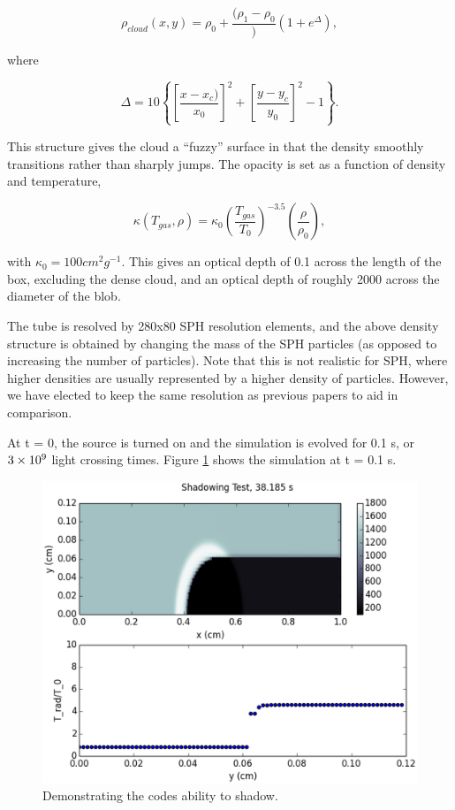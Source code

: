 \begin{equation}
\label{eq:shadowdensity}
\rho_{cloud}(x,y) = \rho_0 + \frac{(\rho_1 - \rho_0}){(1+e^{\Delta})},
\end{equation}

where

\begin{equation}
\label{eq:shadowdelta}
\Delta = 10\left\lbrace\left[\frac{x-x_c)}{x_0}\right]^2 + \left[\frac{y-y_c}{y_0}\right]^2-1\right\rbrace.
\end{equation}

This structure gives the cloud a ``fuzzy'' surface in that the density smoothly transitions rather than sharply jumps. The opacity is set as a function of density and temperature,

\begin{equation}
\label{eq:shadowopacity}
\kappa(T_{gas},\rho) = \kappa_0\left(\frac{T_{gas}}{T_0}\right)^{-3.5}\left(\frac{\rho}{\rho_0}\right),
\end{equation}

with $\kappa_0 = 100 cm^2 g^{-1}$. This gives an optical depth of 0.1 across the length of the box, excluding the dense cloud, and an optical depth of roughly 2000 across the diameter of the blob.

The tube is resolved by 280x80 SPH resolution elements, and the above density structure is obtained by changing the mass of the SPH particles (as opposed to increasing the number of particles). Note that this is not realistic for SPH, where higher densities are usually represented by a higher density of particles. However, we have elected to keep the same resolution as previous papers to aid in comparison.

At t = 0, the source is turned on and the simulation is evolved for 0.1 s, or $3\times 10^{9}$ light crossing times. Figure \ref{fig:shadow} shows the simulation at t = 0.1 s.

\begin{figure}
\includegraphics[width=\textwidth]{graphics/shadow10000.eps}
\caption[Shadowing.]{Demonstrating the codes ability to shadow.}
\label{fig:shadow}
\end{figure}


